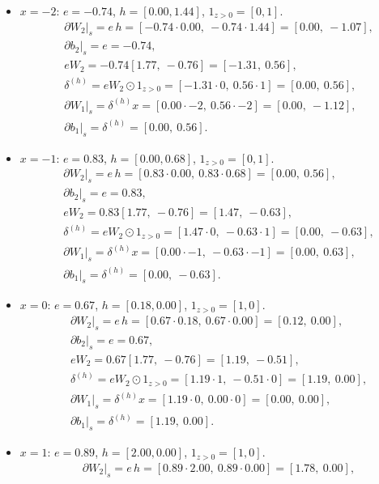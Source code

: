 \documentclass[11pt]{article}
\begin{document}
\begin{itemize}
\item $x=-2$: $e=-0.74$, $h=[0.00, 1.44]$, $1_{z>0}=[0,1]$.
\begin{align*}
&\partial W_2\big|_s = e\,h = [-0.74\cdot0.00,\ -0.74\cdot1.44] = [0.00,\ -1.07],\\
&\partial b_2\big|_s = e = -0.74,\\
&eW_2 = -0.74[1.77,\ -0.76] = [-1.31,\ 0.56],\\
&\delta^{(h)} = eW_2 \odot 1_{z>0} = [-1.31\cdot0,\ 0.56\cdot1] = [0.00,\ 0.56],\\
&\partial W_1\big|_s = \delta^{(h)} x = [0.00\cdot-2,\ 0.56\cdot-2] = [0.00,\ -1.12],\\
&\partial b_1\big|_s = \delta^{(h)} = [0.00,\ 0.56].
\end{align*}
\item $x=-1$: $e=0.83$, $h=[0.00, 0.68]$, $1_{z>0}=[0,1]$.
\begin{align*}
&\partial W_2\big|_s = e\,h = [0.83\cdot0.00,\ 0.83\cdot0.68] = [0.00,\ 0.56],\\
&\partial b_2\big|_s = e = 0.83,\\
&eW_2 = 0.83[1.77,\ -0.76] = [1.47,\ -0.63],\\
&\delta^{(h)} = eW_2 \odot 1_{z>0} = [1.47\cdot0,\ -0.63\cdot1] = [0.00,\ -0.63],\\
&\partial W_1\big|_s = \delta^{(h)} x = [0.00\cdot-1,\ -0.63\cdot-1] = [0.00,\ 0.63],\\
&\partial b_1\big|_s = \delta^{(h)} = [0.00,\ -0.63].
\end{align*}
\item $x=0$: $e=0.67$, $h=[0.18, 0.00]$, $1_{z>0}=[1,0]$.
\begin{align*}
&\partial W_2\big|_s = e\,h = [0.67\cdot0.18,\ 0.67\cdot0.00] = [0.12,\ 0.00],\\
&\partial b_2\big|_s = e = 0.67,\\
&eW_2 = 0.67[1.77,\ -0.76] = [1.19,\ -0.51],\\
&\delta^{(h)} = eW_2 \odot 1_{z>0} = [1.19\cdot1,\ -0.51\cdot0] = [1.19,\ 0.00],\\
&\partial W_1\big|_s = \delta^{(h)} x = [1.19\cdot0,\ 0.00\cdot0] = [0.00,\ 0.00],\\
&\partial b_1\big|_s = \delta^{(h)} = [1.19,\ 0.00].
\end{align*}
\item $x=1$: $e=0.89$, $h=[2.00, 0.00]$, $1_{z>0}=[1,0]$.
\begin{align*}
&\partial W_2\big|_s = e\,h = [0.89\cdot2.00,\ 0.89\cdot0.00] = [1.78,\ 0.00],\\

\end{align*}
\end{itemize}
\end{document}
